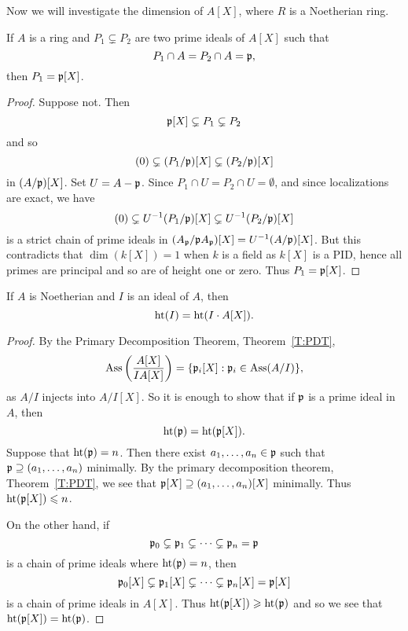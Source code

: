 \documentclass{ximera}
\begin{document}
Now we will investigate the dimension of $A[X]$, where $R$ is a
Noetherian ring.


\begin{lemma}\label{L:FT1} If $A$ is a ring and $P_1\subsetneq P_2$ are two prime ideals of $A[X]$ such that
\[
P_1\cap A = P_2\cap A = \mathfrak{p},
\]
then $P_1 = \mathfrak{p}[X]$.
\end{lemma}

\begin{proof} Suppose not. Then 
\[
\mathfrak{p}[X]\subsetneq P_1\subsetneq P_2 
\]
and so 
\[
(0) \subsetneq (P_1/\mathfrak{p})[X] \subsetneq (P_2/\mathfrak{p})[X]
\]
in $(A/\mathfrak{p}) [X]$. Set $U = A-\mathfrak{p}$.  Since $P_1 \cap U = P_2 \cap U = \emptyset$, and since localizations are exact, we have
\[
(0) \subsetneq U^{-1}(P_1/\mathfrak{p})[X] \subsetneq U^{-1}(P_2/\mathfrak{p})[X]
\]
is a strict chain of prime ideals in $(A_{\mathfrak{p}}/\mathfrak{p} A_{\mathfrak{p}})[X] = U^{-1}(A/\mathfrak{p})[X]$.  But this contradicts that $\dim(k[X]) = 1$ when $k$ is a field as $k[X]$ is a PID, hence all primes are principal and so are of height one or zero.  Thus $P_1 = \mathfrak{p}[X]$.
\end{proof}


\begin{lemma}\label{L:FT2}
  If $A$ is Noetherian and $I$ is an ideal of $A$, then
  \[
  \operatorname{ht}(I) = \operatorname{ht}(I\cdot A[X]).
  \]
  \begin{proof}
    By the Primary Decomposition Theorem, Theorem~\ref{T:PDT}, 
    \[
    \operatorname{Ass}\left(\frac{A[X]}{IA[X]}\right) = \{\mathfrak{p}_i[X]: \mathfrak{p}_i\in\operatorname{Ass}(A/I)\},
    \]
    as $A/I$ injects into $A/I [X]$. So it is enough to show that if $\mathfrak{p}$ is a prime ideal in $A$, then 
    \[
    \operatorname{ht}(\mathfrak{p}) = \operatorname{ht}(\mathfrak{p}[X]).
    \]
    Suppose that $\operatorname{ht}(\mathfrak{p}) = n$. Then there exist $a_1,\dots,a_n\in \mathfrak{p}$
    such that $\mathfrak{p}\supseteq(a_1,\dots,a_n)$ minimally. By the primary
    decomposition theorem, Theorem~\ref{T:PDT}, we see that
    $\mathfrak{p}[X]\supseteq(a_1,\dots,a_n)[X]$ minimally. Thus $\operatorname{ht}(\mathfrak{p}[X])\leqslant n$.
    
    On the other hand, if 
    \[
    \mathfrak{p}_0 \subsetneq \mathfrak{p}_1 \subsetneq \cdots \subsetneq \mathfrak{p}_n = \mathfrak{p}
    \] 
    is a chain of prime ideals where $\operatorname{ht}(\mathfrak{p}) = n$, then 
    \[
    \mathfrak{p}_0[X] \subsetneq \mathfrak{p}_1[X] \subsetneq \cdots \subsetneq \mathfrak{p}_n[X] = \mathfrak{p}[X]
    \]
    is a chain of prime ideals in $A[X]$. Thus $\operatorname{ht}(\mathfrak{p}[X])\geqslant \operatorname{ht}(\mathfrak{p})$
    and so we see that $\operatorname{ht}(\mathfrak{p}[X]) = \operatorname{ht}(\mathfrak{p})$.
\end{proof}
\end{lemma}
\end{document}
